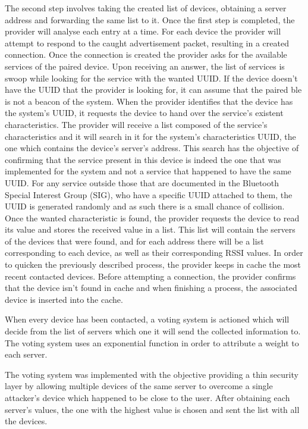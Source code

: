 \documentclass[a4paper]{IEEEtran}
\begin{document}
 
The second step involves taking the created list of devices, obtaining a server address and forwarding the same list to it. Once the first step is completed, the provider will analyse each entry at a time. For each device the provider will attempt to respond to the caught advertisement packet, resulting in a created connection.  Once the connection is created the provider asks for the available services of the paired device. Upon receiving an answer, the list of services is swoop while looking for the service with the wanted UUID. If the device doesn't have the UUID that the provider is looking for, it can assume that the paired ble is not a beacon of the system. When the provider identifies that the device has the system's UUID, it requests the device to hand over the service's existent characteristics. The provider will receive a list composed of the service's characteristics and it will search in it for the system's characteristics UUID, the one which contains the device's server's address. This search has the objective of confirming that the service present in this device is indeed the one that was implemented for the system and not a service that happened to have the same UUID. For any service outside those that are documented in the Bluetooth Special Interest Group (SIG), who have a specific UUID attached to them, the UUID is generated randomly and as such there is a small chance of collision. Once the wanted characteristic is found, the provider requests the device to read its value and stores the received value in a list. This list will contain the servers of the devices that were found, and for each address there will be a list corresponding to each device, as well as their corresponding RSSI values. In order to quicken the previously described process, the provider keeps in cache the most recent contacted devices. Before attempting a connection, the provider confirms that the device isn't found in cache and when finishing a process, the associated device is inserted into the cache. 
 
 
When every device has been contacted, a voting system is actioned which will decide from the list of servers which one it will send the collected information to. The voting system uses an exponential function in order to attribute a weight to each server.  
 
 
The voting system was implemented with the objective providing a thin security layer by allowing multiple devices of the same server to overcome a single attacker's device which happened to be close to the user. After obtaining each server's values, the one with the highest value is chosen and sent the list with all the devices.  
 
\end{document}
